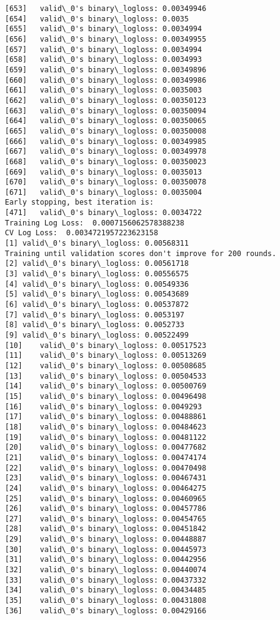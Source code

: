 \documentclass[11pt]{article}
\begin{document}
\begin{Verbatim}[commandchars=\\\{\}]
[653]	valid\_0's binary\_logloss: 0.00349946
[654]	valid\_0's binary\_logloss: 0.0035
[655]	valid\_0's binary\_logloss: 0.0034994
[656]	valid\_0's binary\_logloss: 0.00349955
[657]	valid\_0's binary\_logloss: 0.0034994
[658]	valid\_0's binary\_logloss: 0.0034993
[659]	valid\_0's binary\_logloss: 0.00349896
[660]	valid\_0's binary\_logloss: 0.00349986
[661]	valid\_0's binary\_logloss: 0.0035003
[662]	valid\_0's binary\_logloss: 0.00350123
[663]	valid\_0's binary\_logloss: 0.00350094
[664]	valid\_0's binary\_logloss: 0.00350065
[665]	valid\_0's binary\_logloss: 0.00350008
[666]	valid\_0's binary\_logloss: 0.00349985
[667]	valid\_0's binary\_logloss: 0.00349978
[668]	valid\_0's binary\_logloss: 0.00350023
[669]	valid\_0's binary\_logloss: 0.0035013
[670]	valid\_0's binary\_logloss: 0.00350078
[671]	valid\_0's binary\_logloss: 0.0035004
Early stopping, best iteration is:
[471]	valid\_0's binary\_logloss: 0.0034722
Training Log Loss:  0.0007156062578388238
CV Log Loss:  0.0034721957223623158
[1]	valid\_0's binary\_logloss: 0.00568311
Training until validation scores don't improve for 200 rounds.
[2]	valid\_0's binary\_logloss: 0.00561718
[3]	valid\_0's binary\_logloss: 0.00556575
[4]	valid\_0's binary\_logloss: 0.00549336
[5]	valid\_0's binary\_logloss: 0.00543689
[6]	valid\_0's binary\_logloss: 0.00537872
[7]	valid\_0's binary\_logloss: 0.0053197
[8]	valid\_0's binary\_logloss: 0.0052733
[9]	valid\_0's binary\_logloss: 0.00522499
[10]	valid\_0's binary\_logloss: 0.00517523
[11]	valid\_0's binary\_logloss: 0.00513269
[12]	valid\_0's binary\_logloss: 0.00508685
[13]	valid\_0's binary\_logloss: 0.00504533
[14]	valid\_0's binary\_logloss: 0.00500769
[15]	valid\_0's binary\_logloss: 0.00496498
[16]	valid\_0's binary\_logloss: 0.0049293
[17]	valid\_0's binary\_logloss: 0.00488861
[18]	valid\_0's binary\_logloss: 0.00484623
[19]	valid\_0's binary\_logloss: 0.00481122
[20]	valid\_0's binary\_logloss: 0.00477682
[21]	valid\_0's binary\_logloss: 0.00474174
[22]	valid\_0's binary\_logloss: 0.00470498
[23]	valid\_0's binary\_logloss: 0.00467431
[24]	valid\_0's binary\_logloss: 0.00464275
[25]	valid\_0's binary\_logloss: 0.00460965
[26]	valid\_0's binary\_logloss: 0.00457786
[27]	valid\_0's binary\_logloss: 0.00454765
[28]	valid\_0's binary\_logloss: 0.00451842
[29]	valid\_0's binary\_logloss: 0.00448887
[30]	valid\_0's binary\_logloss: 0.00445973
[31]	valid\_0's binary\_logloss: 0.00442956
[32]	valid\_0's binary\_logloss: 0.00440074
[33]	valid\_0's binary\_logloss: 0.00437332
[34]	valid\_0's binary\_logloss: 0.00434485
[35]	valid\_0's binary\_logloss: 0.00431808
[36]	valid\_0's binary\_logloss: 0.00429166

\end{Verbatim}
\end{document}
